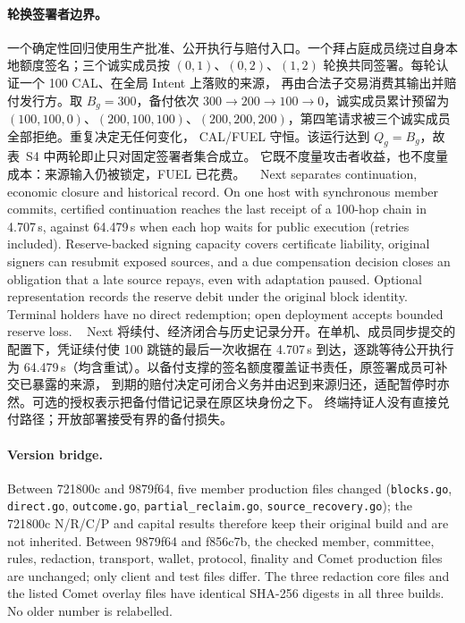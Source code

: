 \paragraph{轮换签署者边界。}
一个确定性回归使用生产批准、公开执行与赔付入口。一个拜占庭成员绕过自身本地额度签名；三个诚实成员按
$(0,1)$、$(0,2)$、$(1,2)$ 轮换共同签署。每轮认证一个 100 CAL、在全局 Intent 上落败的来源，
再由合法子交易消费其输出并赔付发行方。取 $B_g=300$，备付依次 $300\to200\to100\to0$，诚实成员累计预留为
$(100,100,0)$、$(200,100,100)$、$(200,200,200)$，第四笔请求被三个诚实成员全部拒绝。重复决定无任何变化，
CAL/FUEL 守恒。该运行达到 $Q_g=B_g$，故表~S4 中两轮即止只对固定签署者集合成立。
它既不度量攻击者收益，也不度量成本：来源输入仍被锁定，FUEL 已花费。
 
Next separates continuation, economic closure and historical record. On one host
with synchronous member commits, certified continuation reaches the last receipt of a
100-hop chain in 4.707\,s, against 64.479\,s when each hop waits for public execution
(retries included). Reserve-backed signing capacity covers certificate liability,
original signers can resubmit exposed sources, and a due compensation decision closes
an obligation that a late source repays, even with adaptation paused. Optional
representation records the reserve debit under the original block identity. Terminal
holders have no direct redemption; open deployment accepts bounded reserve loss.
 
Next 将续付、经济闭合与历史记录分开。在单机、成员同步提交的配置下，凭证续付使 100 跳链的最后一次收据在
4.707\,s 到达，逐跳等待公开执行为 64.479\,s（均含重试）。以备付支撑的签名额度覆盖证书责任，原签署成员可补交已暴露的来源，
到期的赔付决定可闭合义务并由迟到来源归还，适配暂停时亦然。可选的授权表示把备付借记记录在原区块身份之下。
终端持证人没有直接兑付路径；开放部署接受有界的备付损失。
 
\paragraph{Version bridge.}
Between 721800c and 9879f64, five member production files changed
(\texttt{blocks.go}, \texttt{direct.go}, \texttt{outcome.go}, \texttt{partial\_reclaim.go},
\texttt{source\_recovery.go}); the 721800c N/R/C/P and capital results therefore keep their
original build and are not inherited. Between 9879f64 and f856c7b, the checked member,
committee, rules, redaction, transport, wallet, protocol, finality and Comet production
files are unchanged; only client and test files differ. The three redaction core files and
the listed Comet overlay files have identical SHA-256 digests in all three builds. No
older number is relabelled.
 
